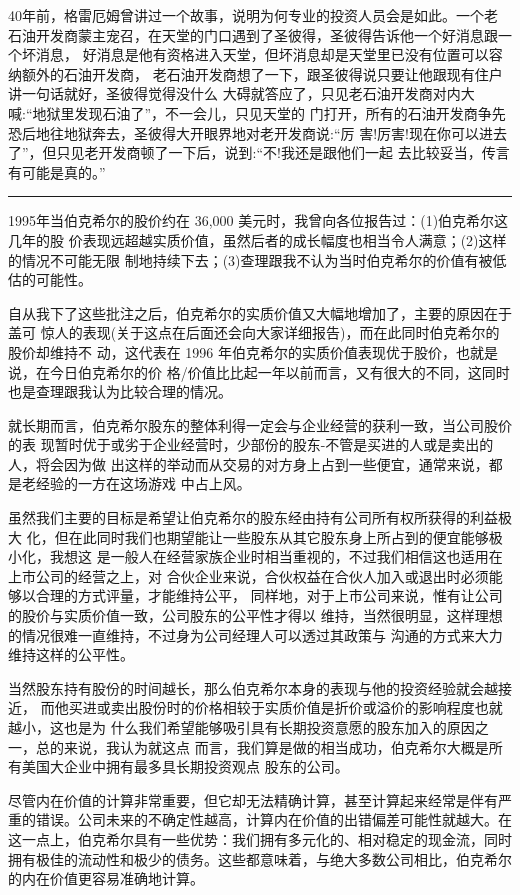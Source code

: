 \documentclass[UTF8,a4paper,zihao=-4,fontset = windows]{ctexart} %
\begin{document}
40年前，格雷厄姆曾讲过一个故事，说明为何专业的投资人员会是如此。一个老
石油开发商蒙主宠召，在天堂的门口遇到了圣彼得，圣彼得告诉他一个好消息跟一个坏消息，
好消息是他有资格进入天堂，但坏消息却是天堂里已没有位置可以容纳额外的石油开发商，
老石油开发商想了一下，跟圣彼得说只要让他跟现有住户讲一句话就好，圣彼得觉得没什么
大碍就答应了，只见老石油开发商对内大喊:“地狱里发现石油了”，不一会儿，只见天堂的
门打开，所有的石油开发商争先恐后地往地狱奔去，圣彼得大开眼界地对老开发商说:“厉
害!厉害!现在你可以进去了”，但只见老开发商顿了一下后，说到:“不!我还是跟他们一起
去比较妥当，传言有可能是真的。”

\rule{10cm}{0.4pt}

1995年当伯克希尔的股价约在 36,000 美元时，我曾向各位报告过：(1)伯克希尔这几年的股
价表现远超越实质价值，虽然后者的成长幅度也相当令人满意；(2)这样的情况不可能无限
制地持续下去；(3)查理跟我不认为当时伯克希尔的价值有被低估的可能性。

自从我下了这些批注之后，伯克希尔的实质价值又大幅地增加了，主要的原因在于盖可
惊人的表现(关于这点在后面还会向大家详细报告)，而在此同时伯克希尔的股价却维持不
动，这代表在 1996 年伯克希尔的实质价值表现优于股价，也就是说，在今日伯克希尔的价
格/价值比比起一年以前而言，又有很大的不同，这同时也是查理跟我认为比较合理的情况。

就长期而言，伯克希尔股东的整体利得一定会与企业经营的获利一致，当公司股价的表
现暂时优于或劣于企业经营时，少部份的股东-不管是买进的人或是卖出的人，将会因为做
出这样的举动而从交易的对方身上占到一些便宜，通常来说，都是老经验的一方在这场游戏
中占上风。

虽然我们主要的目标是希望让伯克希尔的股东经由持有公司所有权所获得的利益极大
化，但在此同时我们也期望能让一些股东从其它股东身上所占到的便宜能够极小化，我想这
是一般人在经营家族企业时相当重视的，不过我们相信这也适用在上市公司的经营之上，对
合伙企业来说，合伙权益在合伙人加入或退出时必须能够以合理的方式评量，才能维持公平，
同样地，对于上市公司来说，惟有让公司的股价与实质价值一致，公司股东的公平性才得以
维持，当然很明显，这样理想的情况很难一直维持，不过身为公司经理人可以透过其政策与
沟通的方式来大力维持这样的公平性。

当然股东持有股份的时间越长，那么伯克希尔本身的表现与他的投资经验就会越接近，
而他买进或卖出股份时的价格相较于实质价值是折价或溢价的影响程度也就越小，这也是为
什么我们希望能够吸引具有长期投资意愿的股东加入的原因之一，总的来说，我认为就这点
而言，我们算是做的相当成功，伯克希尔大概是所有美国大企业中拥有最多具长期投资观点
股东的公司。

尽管内在价值的计算非常重要，但它却无法精确计算，甚至计算起来经常是伴有严重的错误。公司未来的不确定性越高，计算内在价值的出错偏差可能性就越大。在这一点上，伯克希尔具有一些优势：我们拥有多元化的、相对稳定的现金流，同时拥有极佳的流动性和极少的债务。这些都意味着，与绝大多数公司相比，伯克希尔的内在价值更容易准确地计算。
\end{document}

